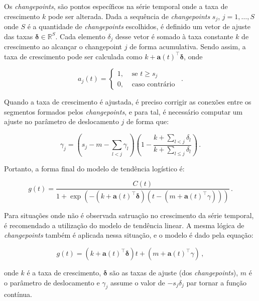 Os \textit{changepoints}, são pontos específicos na série temporal onde a taxa de crescimento $k$ pode ser alterada. Dada a sequência de \textit{changepoints} $s_{j}$, $j=1, \ldots, S$ onde $S$ é a quantidade de \textit{changepoints} escolhidos, é definido um vetor de ajuste das taxas $\boldsymbol{\delta} \in \mathbb{R}^{S}$. Cada elemento $\delta_{j}$ desse vetor é somado à taxa constante $k$ de crescimento ao alcançar o changepoint $j$ de forma acumulativa. Sendo assim, a taxa de crescimento pode ser calculada como $k+\mathbf{a}(t)^{\top} \boldsymbol{\delta}$, onde

\begin{equation}
    a_{j}(t)= \begin{cases}1, & \text { se } t \geq s_{j} \\ 0, & \text { caso contrário }\end{cases}\, .
\end{equation}

Quando a taxa de crescimento é ajustada, é preciso corrigir as conexões entre os segmentos formados pelos \textit{changepoints}, e para tal, é necessário computar um ajuste no parâmetro de deslocamento $j$ de forma que:

\begin{equation}
    \gamma_{j}=\left(s_{j}-m-\sum_{l<j} \gamma_{l}\right)\left(1-\frac{k+\sum_{l<j} \delta_{l}}{k+\sum_{l \leq j} \delta_{l}}\right)\, .
\end{equation}

Portanto, a forma final do modelo de tendência logístico é:

\begin{equation}
    g(t)=\frac{C(t)}{1+\exp \left(-\left(k+\mathbf{a}(t)^{\top} \boldsymbol{\delta}\right)\left(t-\left(m+\mathbf{a}(t)^{\top} \gamma\right)\right)\right)}\, .
\end{equation}

Para situações onde não é observada satruação no crescimento da série temporal, é recomendado a utilização do modelo de tendência linear. A mesma lógica de \textit{changepoints} também é aplicada nessa situação, e o modelo é dado pela equação:

\begin{equation}
    g(t)=\left(k+\mathbf{a}(t)^{\top} \boldsymbol{\delta}\right) t+\left(m+\mathbf{a}(t)^{\top} \gamma\right)\, ,
\end{equation}

onde $k$ é a taxa de crescimento, $\boldsymbol{\delta}$ são as taxas de ajuste (dos \textit{changepoints}), $m$ é o parâmetro de deslocamento e $\gamma_{j}$ assume o valor de $-s_{j}\delta_{j}$ par tornar a função contínua.

